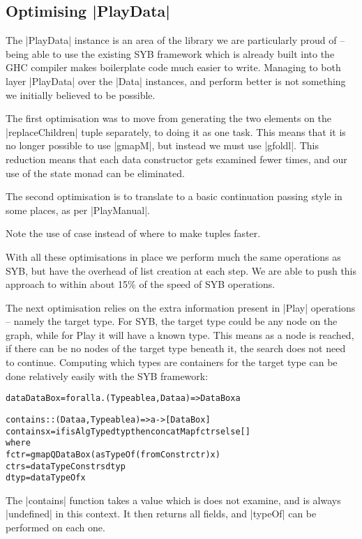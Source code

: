 \documentclass[preprint]{sigplanconf}
\newenvironment{code}{\begin{alltt}\small}{\end{alltt}}
\begin{document}
\subsection{Optimising |PlayData|}

The |PlayData| instance is an area of the library we are particularly proud of -- being able to use the existing SYB framework which is already built into the GHC compiler makes boilerplate code much easier to write. Managing to both layer |PlayData| over the |Data| instances, and perform better is not something we initially believed to be possible.

The first optimisation was to move from generating the two elements on the |replaceChildren| tuple separately, to doing it as one task. This means that it is no longer possible to use |gmapM|, but instead we must use |gfoldl|. This reduction means that each data constructor gets examined fewer times, and our use of the state monad can be eliminated.

The second optimisation is to translate to a basic continuation passing style in some places, as per |PlayManual|.

Note the use of case instead of where to make tuples faster.

With all these optimisations in place we perform much the same operations as SYB, but have the overhead of list creation at each step. We are able to push this approach to within about 15\% of the speed of SYB operations.

The next optimisation relies on the extra information present in |Play| operations -- namely the target type. For SYB, the target type could be any node on the graph, while for Play it will have a known type. This means as a node is reached, if there can be no nodes of the target type beneath it, the search does not need to continue. Computing which types are containers for the target type can be done relatively easily with the SYB framework:

\begin{code}
data DataBox = forall a . (Typeable a, Data a) => DataBox a

contains :: (Data a, Typeable a) => a -> [DataBox]
contains x = if isAlgType dtyp then concatMap f ctrs else []
    where
        f ctr = gmapQ DataBox (asTypeOf (fromConstr ctr) x)
        ctrs = dataTypeConstrs dtyp
        dtyp = dataTypeOf x
\end{code}

The |contains| function takes a value which is does not examine, and is always |undefined| in this context. It then returns all fields, and |typeOf| can be performed on each one.
\end{document}

